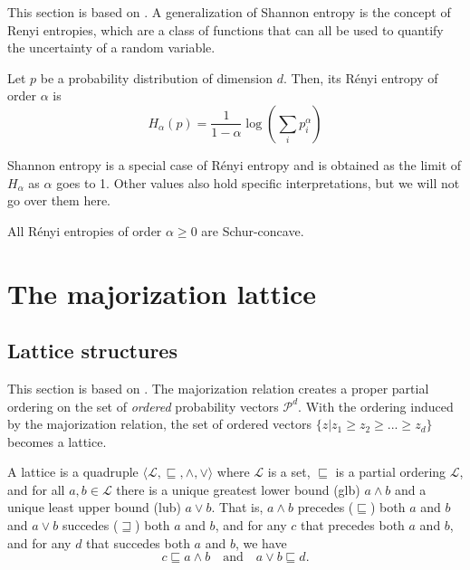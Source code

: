 This section is based on \cite{cover_elements_2006}. A generalization of Shannon entropy is the concept of Renyi entropies, which are a class of functions that can all be used to quantify the uncertainty of a random variable.

\begin{definition} \label{def:renyi_entropies}
    Let $p$ be a probability distribution of dimension $d$. Then, its R\'enyi entropy of order $\alpha$ is
    \begin{equation}
        H_\alpha(p) = \frac{1}{1 - \alpha} \log \left(\sum_i p_i^\alpha\right)
    \end{equation}
\end{definition}

Shannon entropy is a special case of R\'enyi entropy and is obtained as the limit of $H_\alpha$ as $\alpha$ goes to 1. Other values also hold specific interpretations, but we will not go over them here.

\begin{lemma}
    All R\'enyi entropies of order $\alpha \geq 0$ are Schur-concave.    
\end{lemma}



\section{The majorization lattice} \label{sec:majorization_lattice}

\subsection{Lattice structures}

This section is based on \cite{cicalese_supermodularity_2002}. The majorization relation creates a proper partial ordering on the set of \textit{ordered} probability vectors $\mathcal{P}^d$. With the ordering induced by the majorization relation, the set of ordered vectors $\{z | z_1 \geq z_2 \geq ... \geq z_d\}$ becomes a lattice.

\begin{definition}[Lattice] \label{def:lattice} %
    A lattice is a quadruple $\langle \mathcal{L}, \sqsubseteq, \wedge, \vee \rangle$ where $\mathcal{L}$ is a set, $\sqsubseteq$ is a partial ordering $\mathcal{L}$, and for all $a, b \in \mathcal{L}$ there is a unique greatest lower bound (glb) $a \wedge b$ and a unique least upper bound (lub) $a \vee b$. That is, $a \wedge b$ precedes ($\sqsubseteq$) both $a$ and $b$ and $a \vee b$ succedes ($\sqsupseteq$) both $a$ and $b$, and for any $c$ that precedes both $a$ and $b$, and for any $d$ that succedes both $a$ and $b$, we have
    \begin{equation}
        c \sqsubseteq a \wedge b \quad \text{and} \quad a \vee b \sqsubseteq d.
    \end{equation}
\end{definition}

